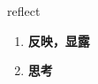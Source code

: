 
\begin{frame}
{\huge reflect}
\begin{center}
\begin{enumerate}\Large
  \item \textbf{反映，显露}
  \item \textbf{思考}
\end{enumerate}
\end{center}
\end{frame}
